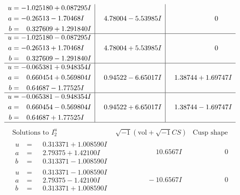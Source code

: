 \documentclass[1p]{elsarticle_modified}
\theoremstyle{definition}
\newcommand{\I}{\sqrt{-1}}
\begin{document}
$$\begin{array}{c|c|c}
\begin{aligned}
u &= -1.025180 + 0.087295 I \\
a &= -0.26513 - 1.70468 I \\
b &= \phantom{-}0.327609 + 1.291840 I\end{aligned}
 & \phantom{-}4.78004 - 5.53985 I & \phantom{-0.000000 } 0 \\ \hline\begin{aligned}
u &= -1.025180 - 0.087295 I \\
a &= -0.26513 + 1.70468 I \\
b &= \phantom{-}0.327609 - 1.291840 I\end{aligned}
 & \phantom{-}4.78004 + 5.53985 I & \phantom{-0.000000 } 0 \\ \hline\begin{aligned}
u &= -0.065381 + 0.948354 I \\
a &= \phantom{-}0.660454 + 0.569804 I \\
b &= \phantom{-}0.64687 - 1.77525 I\end{aligned}
 & \phantom{-}0.94522 - 6.65017 I & \phantom{-}1.38744 + 1.69747 I \\ \hline\begin{aligned}
u &= -0.065381 - 0.948354 I \\
a &= \phantom{-}0.660454 - 0.569804 I \\
b &= \phantom{-}0.64687 + 1.77525 I\end{aligned}
 & \phantom{-}0.94522 + 6.65017 I & \phantom{-}1.38744 - 1.69747 I\\
 \hline 
 \end{array}$$\newpage$$\begin{array}{c|c|c}  
\text{Solutions to }I^u_{2}& \I (\text{vol} + \sqrt{-1}CS) & \text{Cusp shape}\\
 \hline 
\begin{aligned}
u &= \phantom{-}0.313371 + 1.008590 I \\
a &= \phantom{-}2.79375 + 1.42100 I \\
b &= \phantom{-}0.313371 - 1.008590 I\end{aligned}
 & \phantom{-0.000000 -}10.6567 I & \phantom{-0.000000 } 0 \\ \hline\begin{aligned}
u &= \phantom{-}0.313371 - 1.008590 I \\
a &= \phantom{-}2.79375 - 1.42100 I \\
b &= \phantom{-}0.313371 + 1.008590 I\end{aligned}
 & \phantom{-0.000000 } -10.6567 I & \phantom{-0.000000 } 0 \\ \hline\begin{aligned}

\end{aligned}
\end{array}$$
\end{document}
